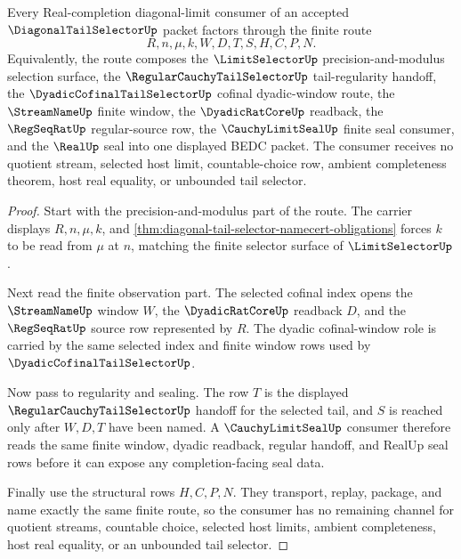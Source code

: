 \begin{theorem}
\label{thm:diagonal-tail-selector-limit-handoff}
Every Real-completion diagonal-limit consumer of an accepted $\DiagonalTailSelectorUp$ packet factors through the finite route
$$
R,n,\mu,k,W,D,T,S,H,C,P,N.
$$
Equivalently, the route composes the $\LimitSelectorUp$ precision-and-modulus selection surface, the $\RegularCauchyTailSelectorUp$ tail-regularity handoff, the $\DyadicCofinalTailSelectorUp$ cofinal dyadic-window route, the $\StreamNameUp$ finite window, the $\DyadicRatCoreUp$ readback, the $\RegSeqRatUp$ regular-source row, the $\CauchyLimitSealUp$ finite seal consumer, and the $\RealUp$ seal into one displayed BEDC packet. The consumer receives no quotient stream, selected host limit, countable-choice row, ambient completeness theorem, host real equality, or unbounded tail selector.
\end{theorem}
\begin{proof}
Start with the precision-and-modulus part of the route. The carrier displays $R,n,\mu,k$, and \autoref{thm:diagonal-tail-selector-namecert-obligations} forces $k$ to be read from $\mu$ at $n$, matching the finite selector surface of $\LimitSelectorUp$.

Next read the finite observation part. The selected cofinal index opens the $\StreamNameUp$ window $W$, the $\DyadicRatCoreUp$ readback $D$, and the $\RegSeqRatUp$ source row represented by $R$. The dyadic cofinal-window role is carried by the same selected index and finite window rows used by $\DyadicCofinalTailSelectorUp$.

Now pass to regularity and sealing. The row $T$ is the displayed $\RegularCauchyTailSelectorUp$ handoff for the selected tail, and $S$ is reached only after $W,D,T$ have been named. A $\CauchyLimitSealUp$ consumer therefore reads the same finite window, dyadic readback, regular handoff, and RealUp seal rows before it can expose any completion-facing seal data.

Finally use the structural rows $H,C,P,N$. They transport, replay, package, and name exactly the same finite route, so the consumer has no remaining channel for quotient streams, countable choice, selected host limits, ambient completeness, host real equality, or an unbounded tail selector.
\end{proof}

